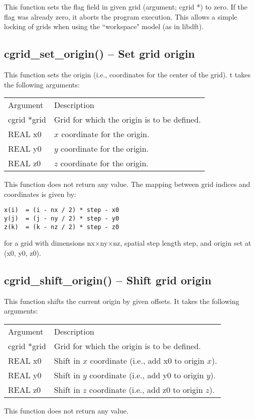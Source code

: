\documentclass[12pt,letterpaper]{report}
\begin{document}
This function sets the flag field in given grid (argument; cgrid *) to zero. If the flag was already zero, it aborts the program execution. This allows a simple locking of grids when using the ``workspace" model (as in libdft).

\subsection{cgrid\_set\_origin() -- Set grid origin}

This function sets the origin (i.e., coordinates for the center of the grid). t takes the following arguments:
\begin{longtable}{p{} p{}}
Argument & Description\\
\cline{1-2}
cgrid *grid & Grid for which the origin is to be defined.\\
REAL x0 & $x$ coordinate for the origin.\\
REAL y0 & $y$ coordinate for the origin.\\
REAL z0 & $z$ coordinate for the origin.\\
\end{longtable}
\noindent
This function does not return any value. The mapping between grid indices and coordinates is given by:
\begin{verbatim}
x(i)  = (i - nx / 2) * step - x0
y(j)  = (j - ny / 2) * step - y0
z(k)  = (k - nz / 2) * step - z0
\end{verbatim}
for a grid with dimensions nx$\times$ny$\times$nz, spatial step length step, and origin set at (x0, y0, z0).

\subsection{cgrid\_shift\_origin() -- Shift grid origin}

This function shifts the current origin by given offsets. It takes the following arguments:
\begin{longtable}{p{} p{}}
Argument & Description\\
\cline{1-2}
cgrid *grid & Grid for which the origin is to be defined.\\
REAL x0 & Shift in $x$ coordinate (i.e., add x0 to origin $x$).\\
REAL y0 & Shift in $y$ coordinate (i.e., add y0 to origin $y$).\\
REAL z0 & Shift in $z$ coordinate (i.e., add z0 to origin $z$).\\
\end{longtable}
\noindent
This function does not return any value.
\end{document}
